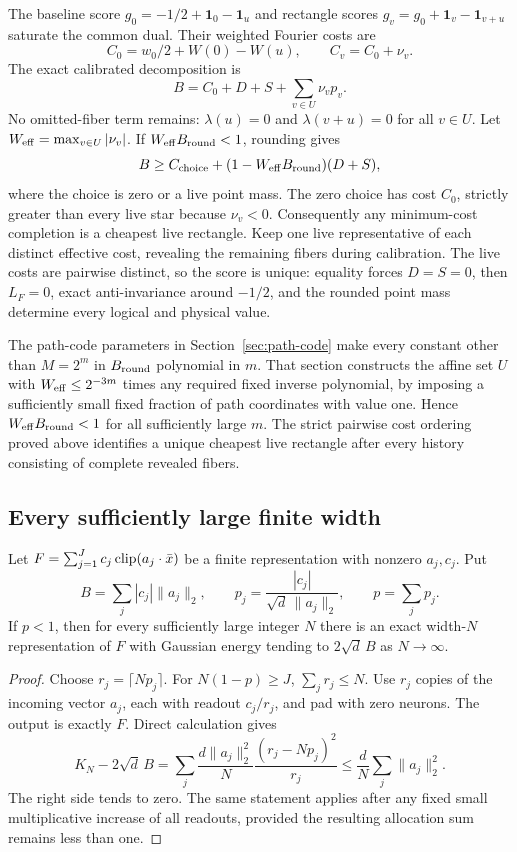 The baseline score $g_0=-1/2+\mathbf1_0-\mathbf1_u$ and rectangle scores
$g_v=g_0+\mathbf1_v-\mathbf1_{v+u}$ saturate the common dual. Their
weighted Fourier costs are
\[
 C_0=w_0/2+W(0)-W(u),\qquad C_v=C_0+\nu_v.
\]
The exact calibrated decomposition is
\[
 B=C_0+D+S+\sum_{v\in U}\nu_v p_v.
\]
No omitted-fiber term remains: $\lambda(u)=0$ and
$\lambda(v+u)=0$ for all $v\in U$.
Let $W_{\rm eff}=\max_{v\in U}|\nu_v|$. If
$W_{\rm eff}B_{\rm round}<1$, rounding gives
\[
 B\ge C_{\rm choice}+(1-W_{\rm eff}B_{\rm round})(D+S),
\]
where the choice is zero or a live point mass. The zero choice has cost
$C_0$, strictly greater than every live star because $\nu_v<0$.
Consequently any minimum-cost completion is a cheapest live rectangle.
Keep one live representative of each distinct effective cost, revealing
the remaining fibers during calibration. The live costs are pairwise
distinct, so the score is unique:
equality forces $D=S=0$, then $L_F=0$, exact anti-invariance around
$-1/2$, and the rounded point mass determine every logical and physical
value.

The path-code parameters in Section~\ref{sec:path-code} make every
constant other than $M=2^m$ in $B_{\rm round}$ polynomial in $m$.
That section constructs the affine set $U$ with
$W_{\rm eff}\le 2^{-3m}$ times any required fixed inverse polynomial,
by imposing a sufficiently small fixed fraction of path coordinates
with value one.
Hence $W_{\rm eff}B_{\rm round}<1$ for all sufficiently large $m$.
The strict pairwise cost ordering proved above identifies a unique
cheapest live rectangle after every history consisting of complete
revealed fibers.

\subsection{Every sufficiently large finite width}

\begin{lemma}
Let $F=\sum_{j=1}^J c_j\operatorname{clip}(a_j\cdot\bar x)$ be a finite
representation with nonzero $a_j,c_j$. Put
\[
 B=\sum_j|c_j|\|a_j\|_2,\qquad
 p_j=\frac{|c_j|}{\sqrt d\,\|a_j\|_2},\qquad p=\sum_jp_j.
\]
If $p<1$, then for every sufficiently large integer $N$ there is an
exact width-$N$ representation of $F$ with Gaussian energy tending to
$2\sqrt d\,B$ as $N\to\infty$.
\end{lemma}
\begin{proof}
Choose $r_j=\lceil Np_j\rceil$. For $N(1-p)\ge J$,
$\sum_jr_j\le N$. Use $r_j$ copies of the incoming vector $a_j$,
each with readout $c_j/r_j$, and pad with zero neurons. The output is
exactly $F$. Direct calculation gives
\[
 K_N-2\sqrt d\,B
 =\sum_j\frac{d\|a_j\|_2^2}{N}
                \frac{(r_j-Np_j)^2}{r_j}
 \le\frac dN\sum_j\|a_j\|_2^2.
\]
The right side tends to zero. The same statement applies after any
fixed small multiplicative increase of all readouts, provided the
resulting allocation sum remains less than one.
\end{proof}

